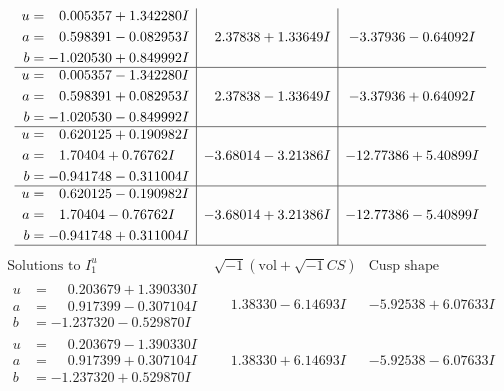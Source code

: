 \documentclass[1p]{elsarticle_modified}
\theoremstyle{definition}
\newcommand{\I}{\sqrt{-1}}
\begin{document}
$$\begin{array}{c|c|c}
\begin{aligned}
u &= \phantom{-}0.005357 + 1.342280 I \\
a &= \phantom{-}0.598391 - 0.082953 I \\
b &= -1.020530 + 0.849992 I\end{aligned}
 & \phantom{-}2.37838 + 1.33649 I & -3.37936 - 0.64092 I \\ \hline\begin{aligned}
u &= \phantom{-}0.005357 - 1.342280 I \\
a &= \phantom{-}0.598391 + 0.082953 I \\
b &= -1.020530 - 0.849992 I\end{aligned}
 & \phantom{-}2.37838 - 1.33649 I & -3.37936 + 0.64092 I \\ \hline\begin{aligned}
u &= \phantom{-}0.620125 + 0.190982 I \\
a &= \phantom{-}1.70404 + 0.76762 I \\
b &= -0.941748 - 0.311004 I\end{aligned}
 & -3.68014 - 3.21386 I & -12.77386 + 5.40899 I \\ \hline\begin{aligned}
u &= \phantom{-}0.620125 - 0.190982 I \\
a &= \phantom{-}1.70404 - 0.76762 I \\
b &= -0.941748 + 0.311004 I\end{aligned}
 & -3.68014 + 3.21386 I & -12.77386 - 5.40899 I\\
 \hline 
 \end{array}$$\newpage$$\begin{array}{c|c|c}  
\text{Solutions to }I^u_{1}& \I (\text{vol} + \sqrt{-1}CS) & \text{Cusp shape}\\
 \hline 
\begin{aligned}
u &= \phantom{-}0.203679 + 1.390330 I \\
a &= \phantom{-}0.917399 - 0.307104 I \\
b &= -1.237320 - 0.529870 I\end{aligned}
 & \phantom{-}1.38330 - 6.14693 I & -5.92538 + 6.07633 I \\ \hline\begin{aligned}
u &= \phantom{-}0.203679 - 1.390330 I \\
a &= \phantom{-}0.917399 + 0.307104 I \\
b &= -1.237320 + 0.529870 I\end{aligned}
 & \phantom{-}1.38330 + 6.14693 I & -5.92538 - 6.07633 I \\ \hline\begin{aligned}

\end{aligned}
\end{array}$$
\end{document}
